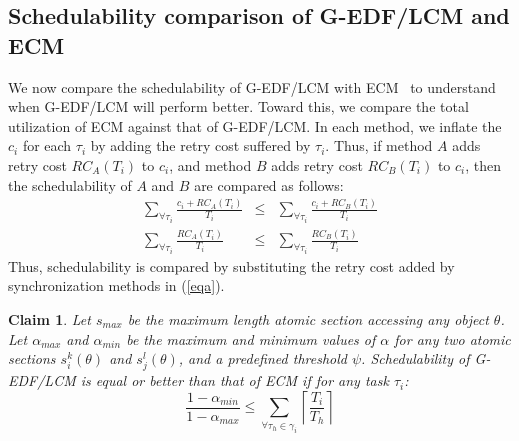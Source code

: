 \documentclass[conference]{sig-alternate}
\newtheorem{clm}{Claim}
\begin{document}
\subsection{Schedulability comparison of G-EDF/LCM and ECM}
\label{performance g-edf-lcm}
We now compare the schedulability of G-EDF/LCM with ECM~\cite{stmconcurrencycontrol:emsoft11} %
to understand when G-EDF/LCM will perform better. 
Toward this, we compare the total utilization of ECM against that of G-EDF/LCM. In each method, we inflate the $c_i$ for each $\tau_i$ by adding the retry cost suffered by $\tau_i$. Thus, if method $A$ adds retry cost $RC_A(T_i)$ to $c_i$, and method $B$ adds retry cost $RC_B(T_i)$ to $c_i$, then the schedulability of $A$ and $B$ are compared as follows:
\begin{eqnarray}
\sum_{\forall \tau_{i}}\frac{c_{i}+RC_A(T_{i})}{T_{i}} & \le & \sum_{\forall \tau_{i}}\frac{c_{i}+RC_B(T_{i})}{T_{i}}\nonumber\\
\sum_{\forall \tau_{i}}\frac{RC_A(T_{i})}{T_{i}} & \le & \sum_{\forall \tau_{i}}\frac{RC_B(T_{i})}{T_{i}}
\label{eqa}\end{eqnarray}
Thus, schedulability is compared by substituting the retry cost added by synchronization methods in (\ref{eqa}).

\begin{clm}\label{lcm versus ecm}
Let $s_{max}$ be the maximum length atomic section accessing any object $\theta$. Let $\alpha_{max}$ and $\alpha_{min}$ be the maximum and minimum values of $\alpha$ for any two atomic sections $s_i^k(\theta)$ and $s_j^l(\theta)$, and a predefined threshold $\psi$.  Schedulability of G-EDF/LCM is equal or better than that of  ECM if for any task $\tau_i$:
\begin{equation}
\frac{1-\alpha_{min}}{1-\alpha_{max}} \le \sum_{\forall \tau_h \in \gamma_i}\left\lceil\frac{T_i}{T_h}\right\rceil
\label{edf-lcm-ecm}\end{equation}
\end{clm}
\end{document}
